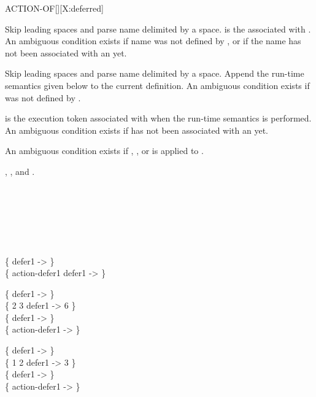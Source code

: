 \begin{worddef}{}{ACTION-OF}[][X:deferred]
\interpret

	Skip leading spaces and parse name delimited by a space.
	 is the  associated with .
	An ambiguous condition exists if name was not defined by
	, or if the name has not been associated with
	an  yet.

\compile

	Skip leading spaces and parse name delimited by a space.
	Append the run-time semantics given below to the current
	definition. An ambiguous condition exists if 
	was not defined by .

\runtime

	 is the execution token associated with 
	when the run-time semantics is performed. An ambiguous condition
	exists if  has not been associated with an
	 yet.

	An ambiguous condition exists if , \word{[COMPILE]},
	\word{[']} or  is applied to .

\see {},
	,
	 and
	.

	\begin{defer}
	\implementation
		\word{:}  \\
		\tab {}   \\
		\tab[2]  \word{[']}   \\
		\tab {} \\
		\tab[2]   \\
		\tab {} \word{;} 

	\testing
		\{  defer1 -> \} \\
		\{ \word{:} action-defer1  defer1 \word{;} -> \}

		\{  \word{*}  defer1  -> \} \\
		\{ 2 3 defer1 -> 6 \} \\
		\{  defer1 ->  \word{*} \} \\
		\{ action-defer1 ->  \word{*} \}

		\{  \word{+}  defer1 -> \} \\
		\{ 1 2 defer1 -> 3 \} \\
		\{  defer1 ->  \word{+} \} \\
		\{ action-defer1 ->  \word{+} \}
	\end{defer}
\end{worddef}


